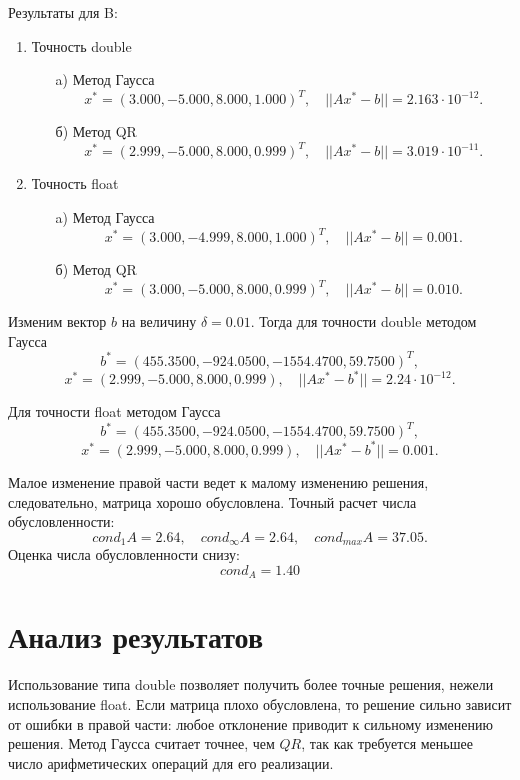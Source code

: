 \documentclass[12pt, a4paper]{article}
\begin{document}
Результаты для B:
\begin{enumerate}
\item Точность double
	\begin{enumerate}
	\item[a)] Метод Гаусса
	$$x^* = (3{.}000 , -5{.}000, 8{.}000 ,1{.}000)^{T},\quad ||Ax^{*}-b|| = 2{.}163\cdot10^{-12}.$$
	\item[б)] Метод QR
	$$x^* = (2{.}999 , -5{.}000, 8{.}000 ,0{.}999)^{T},\quad ||Ax^{*}-b|| = 3{.}019\cdot10^{-11}.$$
	\end{enumerate}
\item Точность float
	\begin{enumerate}
	\item[a)] Метод Гаусса
	$$x^* = (3{.}000 , -4{.}999, 8{.}000, 1{.}000)^{T},\quad ||Ax^{*}-b|| = 0{.}001.$$
	\item[б)] Метод QR
	$$x^* = (3{.}000 , -5{.}000, 8{.}000, 0{.}999)^{T},\quad ||Ax^{*}-b|| = 0{.}010.$$
	\end{enumerate}
\end{enumerate}
Изменим вектор $b$ на величину $\delta = 0.01$. Тогда для точности double методом Гаусса
$$b^* = (455.3500, -924{.}0500, -1554{.}4700, 59{.}7500)^T,$$
$$x^* = (2{.}999, -5{.}000, 8{.}000, 0{.}999), \quad ||Ax^{*}-b^*|| =  2{.}24\cdot10^{-12}.$$

Для точности float методом Гаусса
$$b^* = (455.3500, -924{.}0500, -1554{.}4700, 59{.}7500)^T,$$
$$x^* = (2{.}999, -5{.}000, 8{.}000, 0{.}999), \quad ||Ax^{*}-b^*|| =  0{.}001.$$

Малое изменение правой части ведет к малому изменению решения, следовательно, матрица хорошо обусловлена. Точный расчет числа обусловленности: 
$$cond_1A = 2{.}64,\quad cond_{\infty}A = 2{.}64, \quad cond_{max}A = 37{.}05.$$
Оценка числа обусловленности снизу:
$$cond_A = 1{.}40$$
\newpage

\section{Анализ результатов}
Использование типа double позволяет получить более точные решения,
нежели использование float. Если матрица плохо обусловлена, то решение сильно зависит от ошибки в правой части: любое отклонение приводит к сильному изменению решения. Метод Гаусса считает точнее, чем $QR$, так как требуется меньшее число арифметических операций для его реализации.

\newpage
\end{document}
